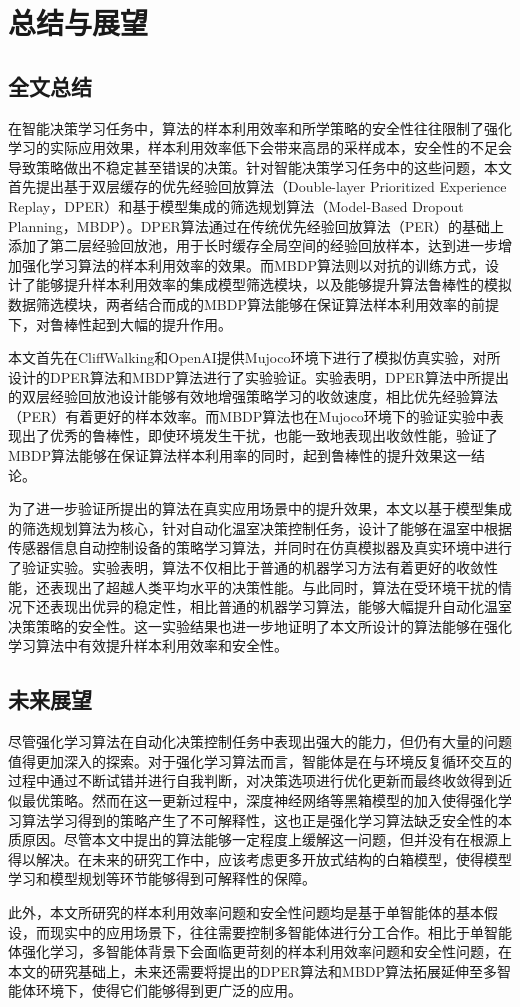 
\chapter{总结与展望}\label{chap:summary}

\section{全文总结}

在智能决策学习任务中，算法的样本利用效率和所学策略的安全性往往限制了强化学习的实际应用效果，样本利用效率低下会带来高昂的采样成本，安全性的不足会导致策略做出不稳定甚至错误的决策。针对智能决策学习任务中的这些问题，本文首先提出基于双层缓存的优先经验回放算法（Double-layer Prioritized Experience Replay，DPER）和基于模型集成的筛选规划算法（Model-Based Dropout Planning，MBDP）。DPER算法通过在传统优先经验回放算法（PER）的基础上添加了第二层经验回放池，用于长时缓存全局空间的经验回放样本，达到进一步增加强化学习算法的样本利用效率的效果。而MBDP算法则以对抗的训练方式，设计了能够提升样本利用效率的集成模型筛选模块，以及能够提升算法鲁棒性的模拟数据筛选模块，两者结合而成的MBDP算法能够在保证算法样本利用效率的前提下，对鲁棒性起到大幅的提升作用。

本文首先在CliffWalking和OpenAI提供Mujoco环境下进行了模拟仿真实验，对所设计的DPER算法和MBDP算法进行了实验验证。实验表明，DPER算法中所提出的双层经验回放池设计能够有效地增强策略学习的收敛速度，相比优先经验算法（PER）有着更好的样本效率。而MBDP算法也在Mujoco环境下的验证实验中表现出了优秀的鲁棒性，即使环境发生干扰，也能一致地表现出收敛性能，验证了MBDP算法能够在保证算法样本利用率的同时，起到鲁棒性的提升效果这一结论。

为了进一步验证所提出的算法在真实应用场景中的提升效果，本文以基于模型集成的筛选规划算法为核心，针对自动化温室决策控制任务，设计了能够在温室中根据传感器信息自动控制设备的策略学习算法，并同时在仿真模拟器及真实环境中进行了验证实验。实验表明，算法不仅相比于普通的机器学习方法有着更好的收敛性能，还表现出了超越人类平均水平的决策性能。与此同时，算法在受环境干扰的情况下还表现出优异的稳定性，相比普通的机器学习算法，能够大幅提升自动化温室决策策略的安全性。这一实验结果也进一步地证明了本文所设计的算法能够在强化学习算法中有效提升样本利用效率和安全性。

\section{未来展望}

尽管强化学习算法在自动化决策控制任务中表现出强大的能力，但仍有大量的问题值得更加深入的探索。对于强化学习算法而言，智能体是在与环境反复循环交互的过程中通过不断试错并进行自我判断，对决策选项进行优化更新而最终收敛得到近似最优策略。然而在这一更新过程中，深度神经网络等黑箱模型的加入使得强化学习算法学习得到的策略产生了不可解释性，这也正是强化学习算法缺乏安全性的本质原因。尽管本文中提出的算法能够一定程度上缓解这一问题，但并没有在根源上得以解决。在未来的研究工作中，应该考虑更多开放式结构的白箱模型，使得模型学习和模型规划等环节能够得到可解释性的保障。

此外，本文所研究的样本利用效率问题和安全性问题均是基于单智能体的基本假设，而现实中的应用场景下，往往需要控制多智能体进行分工合作。相比于单智能体强化学习，多智能体背景下会面临更苛刻的样本利用效率问题和安全性问题，在本文的研究基础上，未来还需要将提出的DPER算法和MBDP算法拓展延伸至多智能体环境下，使得它们能够得到更广泛的应用。